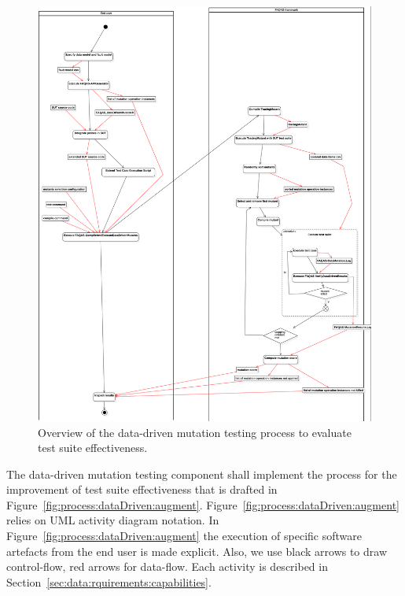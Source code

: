 \begin{figure}[h]
  \centering
	\includegraphics[width=15cm]{images/png/Activity1!DataDrivenTestSuiteEvaluation_3.png}
      \caption{Overview of the data-driven mutation testing process to evaluate test suite effectiveness.}
      \label{fig:process:dataDriven:evaluation}
\end{figure}

\RQ{} The data-driven mutation testing component shall implement the process for the improvement of test suite effectiveness that is drafted in Figure~\ref{fig:process:dataDriven:augment}. Figure~\ref{fig:process:dataDriven:augment} relies on UML activity diagram notation. In Figure~\ref{fig:process:dataDriven:augment} the execution of specific software artefacts from the end user is made explicit. Also, we use black arrows to draw control-flow, red arrows for data-flow. Each activity is described in Section~\ref{sec:data:rquirements:capabilities}.

